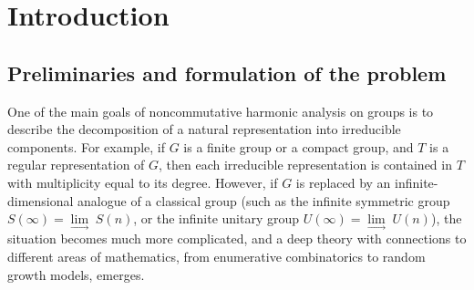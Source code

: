 \documentclass[12pt]{amsart}
\theoremstyle{definition}
\numberwithin{equation}{section}
\begin{document}
\section{Introduction}
\subsection{Preliminaries and formulation of the problem}\label{SubsectionPreliminaries}
One of the main goals of noncommutative harmonic analysis on groups
is to  describe the decomposition of a natural representation into irreducible components. For example, if $G$ is a finite group or a compact group, and $T$ is a regular
representation of $G$, then  each irreducible
representation is contained in $T$ with multiplicity equal to its degree.
However, if $G$ is replaced by an infinite-dimensional analogue of a classical
group (such as the infinite symmetric group $S(\infty)=\underset{\longrightarrow}{\lim}\;S(n)$, or the infinite unitary group $U(\infty)=\underset{\longrightarrow}{\lim}\;U(n)$), the situation becomes much more complicated, and a deep theory
with connections to different areas of mathematics, from enumerative combinatorics to random growth models, emerges.
\end{document}
